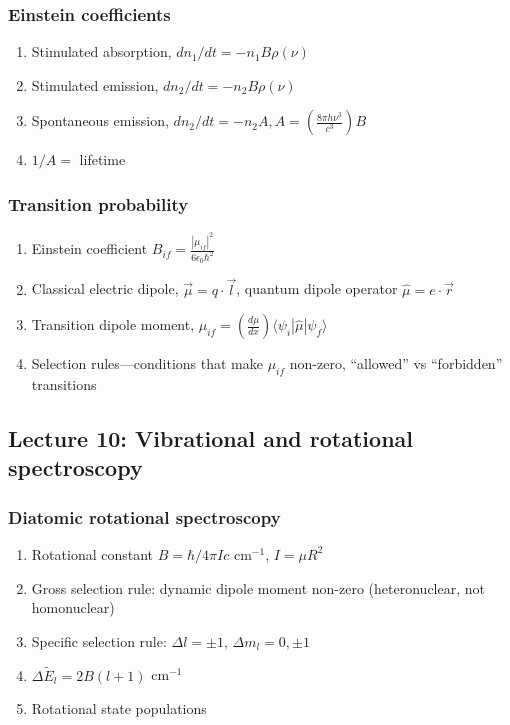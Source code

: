 \documentclass[11pt]{article}
\begin{document}
\subsubsection{Einstein coefficients}
\label{sec:org6c704da}
\begin{enumerate}
\item Stimulated absorption, \(dn_1/dt= -n_1 B\rho(\nu)\)
\item Stimulated emission, \(dn_2/dt= -n_2 B\rho(\nu)\)
\item Spontaneous emission, \(dn_2/dt=-n_2 A, A=\left ( \frac{8\pi h
              \nu^3}{c^3}\right )B\)
\item \(1/A=\) lifetime
\end{enumerate}
\subsubsection{Transition probability}
\label{sec:orgba75849}
\begin{enumerate}
\item Einstein coefficient \(B_{if}=\frac{|\mu_{if}|^2}{6\epsilon_0\hbar^2}\)
\item Classical electric dipole, \(\overrightarrow{\mu}=q \cdot
          \overrightarrow{l}\), quantum dipole operator \(\hat\mu = e\cdot \overrightarrow{r}\)
\item Transition dipole moment, \(\mu_{if} = \left(
        \frac{d\mu}{dx}\right ) \langle \psi_i|\hat\mu |\psi_f \rangle\)
\item Selection rules---conditions that make \(\mu_{if}\) non-zero,
``allowed'' vs ``forbidden'' transitions
\end{enumerate}
\subsection{Lecture 10: Vibrational and rotational spectroscopy}
\label{sec:org09ae68b}
\subsubsection{Diatomic rotational spectroscopy}
\label{sec:orgc825a4e}
\begin{enumerate}
\item Rotational constant \(B = \hbar/4\pi I c\) cm\(^{-1}\), \(I=\mu R^2\)
\item Gross selection rule: dynamic dipole moment non-zero (heteronuclear, not homonuclear)
\item Specific selection rule: \(\Delta l=\pm 1\), \(\Delta m_l=0, \pm1\)
\item \(\Delta \tilde E_l  = 2B(l+1)\) cm\(^{-1}\)
\item Rotational state populations
\end{enumerate}
\end{document}
